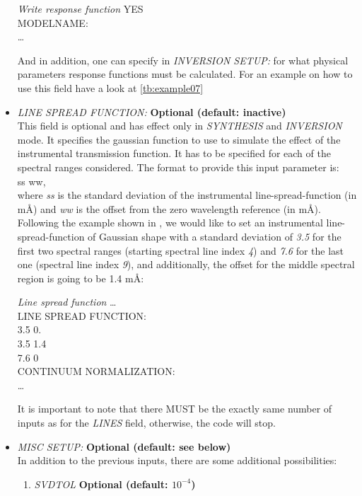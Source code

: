 \begin{itemize}
\begin{ifbox}[label={tb:write_response_function}]{{\it Write response function}}
  YES\\
  MODELNAME:\\
  \ldots
  \normalsize
\end{ifbox}
And in addition, one can specify in {\it INVERSION SETUP:} for what physical parameters response functions must be calculated. For an example on how to use this field have a look at \ref{tb:example07}
  \item {\it LINE SPREAD FUNCTION:} {\bf Optional (default: inactive)}\\
  This field is optional and has effect only in {\it SYNTHESIS} and {\it INVERSION} mode. It specifies the gaussian function to use to simulate the effect of the instrumental transmission function. It has to be specified for each of the spectral ranges considered. The format to provide this input parameter is:\\
  ss  ww,\\
  where {\it ss} is the standard deviation of the instrumental line-spread-function (in m{\AA}) and {\it ww} is the offset from the zero wavelength reference (in m{\AA}). Following the example shown in , we would like to set an instrumental line-spread-function of Gaussian shape with a standard deviation of {\it 3.5} for the first two spectral ranges (starting spectral line index {\it 4}) and {\it 7.6} for the last one (spectral line index {\it 9}), and additionally, the offset for the middle spectral region is going to be 1.4 m{\AA}:\\
\begin{ifbox}[label={tb:line_spread_function}]{{\it Line spread function}}
  \scriptsize
  \ldots\\
  LINE SPREAD FUNCTION:\\
  3.5 0.\\
  3.5 1.4\\
  7.6 0\\
  CONTINUUM NORMALIZATION:\\
  \ldots
  \normalsize
\end{ifbox}
  It is important to note that there MUST be the exactly same number of inputs as for the {\it LINES} field, otherwise, the code will stop.
  \item {\it MISC SETUP:} {\bf Optional (default: see below)}\\
  In addition to the previous inputs, there are some additional possibilities:
  \begin{enumerate}
    \item {\it SVDTOL} {\bf Optional (default: $10^{-4}$)}\\

\end{enumerate}
\end{itemize}
